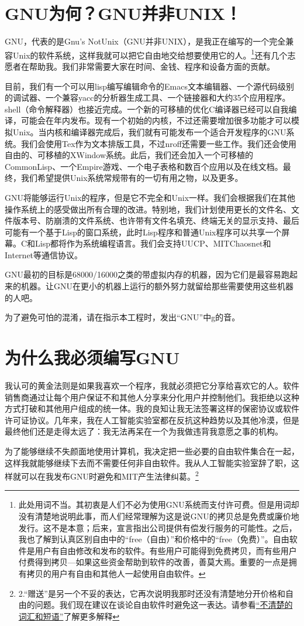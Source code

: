 \section{GNU为何？GNU并非UNIX！}
GNU，代表的是Gnu's NotUnix（GNU并非UNIX），是我正在编写的一个完全兼容Unix的软件系统，这样我就可以把它自由地交给想要使用它的人。\footnote{此处用词不当。其初衷是人们不必为使用GNU系统而支付许可费。但是用词却没有清楚地说明此事，而人们经常理解为这是说GNU的拷贝总是免费或廉价地发行。这不是本意；后来，宣言指出公司提供有偿发行服务的可能性。之后，我也了解到认真区别自由中的“free（自由）”和价格中的“free（免费）”。自由软件是用户有自由修改和发布的软件。有些用户可能得到免费拷贝，而有些用户付费得到拷贝—如果这些资金帮助到软件的改善，善莫大焉。重要的一点是拥有拷贝的用户有自由和其他人一起使用自由软件。}还有几个志愿者在帮助我。我们非常需要大家在时间、金钱、程序和设备方面的贡献。\par
目前，我们有一个可以用lisp编写编辑命令的Emacs文本编辑器、一个源代码级别的调试器、一个兼容yacc的分析器生成工具、一个链接器和大约35个应用程序。shell（命令解释器）也接近完成。一个新的可移植的优化C编译器已经可以自我编译，可能会在年内发布。现有一个初始的内核，不过还需要增加很多功能才可以模拟Unix。当内核和编译器完成后，我们就有可能发布一个适合开发程序的GNU系统。我们会使用Tex作为文本排版工具，不过nroff还需要一些工作。我们还会使用自由的、可移植的XWindow系统。此后，我们还会加入一个可移植的CommonLisp、一个Empire游戏、一个电子表格和数百个应用以及在线文档。最终，我们希望提供Unix系统常规带有的一切有用之物，以及更多。\par
GNU将能够运行Unix的程序，但是它不完全和Unix一样。我们会根据我们在其他操作系统上的感受做出所有合理的改进。特别地，我们计划使用更长的文件名、文件版本号、防崩溃的文件系统、也许带有文件名填充、终端无关的显示支持、最后可能有一个基于Lisp的窗口系统，此时Lisp程序和普通Unix程序可以共享一个屏幕。C和Lisp都将作为系统编程语言。我们会支持UUCP、MITChaosnet和Internet等通信协议。\par
GNU最初的目标是68000/16000之类的带虚拟内存的机器，因为它们是最容易跑起来的机器。让GNU在更小的机器上运行的额外努力就留给那些需要使用这些机器的人吧。\par
为了避免可怕的混淆，请在指示本工程时，发出“GNU”中g的音。
\section{为什么我必须编写GNU}
我认可的黄金法则是如果我喜欢一个程序，我就必须把它分享给喜欢它的人。软件销售商通过让每个用户保证不和其他人分享来分化用户并控制他们。我拒绝以这种方式打破和其他用户组成的统一体。我的良知让我无法签署这样的保密协议或软件许可证协议。几年来，我在人工智能实验室都在反抗这种趋势以及其他冷漠，但是最终他们还是走得太远了：我无法再呆在一个为我做违背我意愿之事的机构。\par
为了能够继续不失颜面地使用计算机，我决定把一些必要的自由软件集合在一起，这样我就能够继续下去而不需要任何非自由软件。我从人工智能实验室辞了职，这样就可以在我发布GNU时避免和MIT产生法律纠葛。\footnote{2.“赠送”是另一个不妥的表达，它再次说明我那时还没有清楚地分开价格和自由的问题。我们现在建议在谈论自由软件时避免这一表达。请参看\href{http://www.gnu.org/philosophy/words-to-avoid.html\#GiveAwaySoftware}{“不清楚的词汇和短语”}了解更多解释}\par
